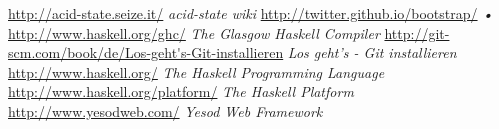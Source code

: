 \begin{thebibliography}{}
    \url{http://acid-state.seize.it/}
    \emph{acid-state wiki}
    \url{http://twitter.github.io/bootstrap/}
    \emph{•}
    \url{http://www.haskell.org/ghc/}
    \emph{The Glasgow Haskell Compiler}
    \url{http://git-scm.com/book/de/Los-geht's-Git-installieren}
    \emph{Los geht's - Git installieren}
    \url{http://www.haskell.org/}
    \emph{The Haskell Programming Language}
    \url{http://www.haskell.org/platform/}
    \emph{The Haskell Platform}
    \url{http://www.yesodweb.com/}
    \emph{Yesod Web Framework}
\end{thebibliography}